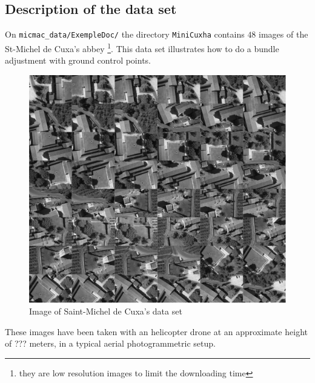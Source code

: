 
\subsection{Description of the data set}
\label{Cuxa:DataSet}

On {\tt micmac\_data/ExempleDoc/} the directory {\tt MiniCuxha} contains
$48$ images of the St-Michel de Cuxa's abbey \footnote{they are low resolution images
to limit the  downloading time}. This data set illustrates how to
do a bundle adjustment with ground control points.


\begin{figure}[H]
\begin{center}
\includegraphics[width=160mm]{FIGS/Cuxa/Planche.jpg}
\caption{Image of Saint-Michel de Cuxa's data set }
\end{center}
\label{FIG:Glob:Cuxa}
\end{figure}

These images have been taken with an helicopter drone at an approximate height of ??? meters, in a typical aerial photogrammetric setup.

